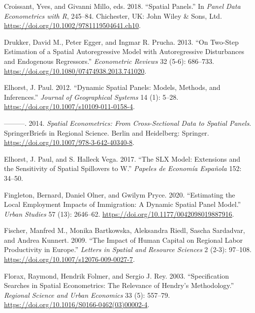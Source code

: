 \documentclass[
  letterpaper,
  DIV=11,
  numbers=noendperiod]{scrreprt}
\newlength{\cslhangindent}
\newlength{\cslentryspacingunit} %
\newenvironment{CSLReferences}[2] %
 {%
  \setlength{\parindent}{0pt}
  \ifodd #1
  \let\oldpar\par
  \def\par{\hangindent=\cslhangindent\oldpar}
  \fi
  \setlength{\parskip}{#2\cslentryspacingunit}
 }%
 {}
\begin{document}
\begin{CSLReferences}{1}{0}
\leavevmode{}%
Croissant, Yves, and Givanni Millo, eds. 2018. {``Spatial {Panels}.''}
In \emph{Panel {Data Econometrics} with {R}}, 245--84. {Chichester, UK}:
{John Wiley \& Sons, Ltd}.
\url{https://doi.org/10.1002/9781119504641.ch10}.

\leavevmode{}%
Drukker, David M., Peter Egger, and Ingmar R. Prucha. 2013. {``On
{Two-Step Estimation} of a {Spatial Autoregressive Model} with
{Autoregressive Disturbances} and {Endogenous Regressors}.''}
\emph{Econometric Reviews} 32 (5-6): 686--733.
\url{https://doi.org/10.1080/07474938.2013.741020}.

\leavevmode{}%
Elhorst, J. Paul. 2012. {``Dynamic Spatial Panels: Models, Methods, and
Inferences.''} \emph{Journal of Geographical Systems} 14 (1): 5--28.
\url{https://doi.org/10.1007/s10109-011-0158-4}.

\leavevmode{}%
---------. 2014. \emph{Spatial {Econometrics}: {From Cross-Sectional
Data} to {Spatial Panels}}. {SpringerBriefs} in {Regional Science}.
{Berlin and Heidelberg}: {Springer}.
\url{https://doi.org/10.1007/978-3-642-40340-8}.

\leavevmode{}%
Elhorst, J. Paul, and S. Halleck Vega. 2017. {``The {SLX Model}:
{Extensions} and the {Sensitivity} of {Spatial Spillovers} to {W}.''}
\emph{Papeles de Economía Española} 152: 34--50.

\leavevmode{}%
Fingleton, Bernard, Daniel Olner, and Gwilym Pryce. 2020. {``Estimating
the Local Employment Impacts of Immigration: {A} Dynamic Spatial Panel
Model.''} \emph{Urban Studies} 57 (13): 2646--62.
\url{https://doi.org/10.1177/0042098019887916}.

\leavevmode{}%
Fischer, Manfred M., Monika Bartkowska, Aleksandra Riedl, Sascha
Sardadvar, and Andrea Kunnert. 2009. {``The Impact of Human Capital on
Regional Labor Productivity in {Europe}.''} \emph{Letters in Spatial and
Resource Sciences} 2 (2-3): 97--108.
\url{https://doi.org/10.1007/s12076-009-0027-7}.

\leavevmode{}%
Florax, Raymond, Hendrik Folmer, and Sergio J. Rey. 2003.
{``Specification {Searches} in {Spatial Econometrics}: {The Relevance}
of {Hendry}'s {Methodology}.''} \emph{Regional Science and Urban
Economics} 33 (5): 557--79.
\url{https://doi.org/10.1016/S0166-0462(03)00002-4}.


\end{CSLReferences}
\end{document}
